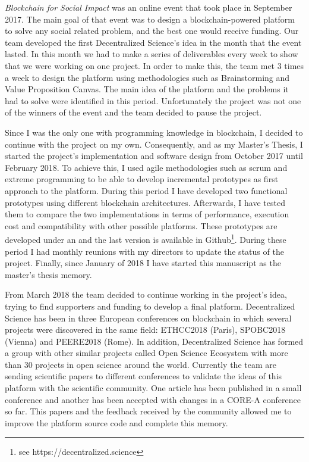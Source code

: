 \begin{itemize}
   \emph{Blockchain for Social Impact} was an online event
  that took place in September 2017. The main goal of that event was to design a
  blockchain-powered platform to solve any social related problem, and the best
  one would receive funding. Our team developed the first Decentralized
  Science's idea in the month that the event lasted. In this month we had to
  make a series of deliverables every week to show that we were working on one
  project. In order to make this, the team met 3 times a week to design the
  platform using methodologies such as Brainstorming and Value Proposition
  Canvas. The main idea of the platform and the problems it had to solve were
  identified in this period. Unfortunately the project was not one of the
  winners of the event and the team decided to pause the project.

   Since I was the only one with programming
  knowledge in blockchain, I decided to continue with the project on my own.
  Consequently, and as my Master's Thesis, I started the project's
  implementation and software design from October 2017 until February 2018. To
  achieve this, I used agile methodologies such as scrum and extreme programming
  to be able to develop incremental prototypes as first approach to the
  platform. During this period I have developed two functional prototypes using
  different blockchain architectures. Afterwards, I have tested them to compare
  the two implementations in terms of performance, execution cost and
  compatibility with other possible platforms. These prototypes are developed
  under an  and the last version is available in
  Github\footnote{see https://decentralized.science}. During these period I had
  monthly reunions with my directors to update the status of the project.
  Finally, since January of 2018 I have started this manuscript as the master's
  thesis memory.

   From March 2018 the team decided to continue working in
  the project's idea, trying to find supporters and funding to develop a final
  platform. Decentralized Science has been in three European conferences on
  blockchain in which several projects were discovered in the same field:
  ETHCC2018 (Paris), SPOBC2018 (Vienna) and PEERE2018 (Rome). In addition,
  Decentralized Science has formed a group with other similar projects called
  Open Science Ecosystem with more than 30 projects in open science around the
  world. Currently the team are sending scientific papers to different
  conferences to validate the ideas of this platform with the scientific
  community. One article has been published in a small conference and another
  has been accepted with changes in a CORE-A conference so far. This papers and
  the feedback received by the community allowed me to improve the platform
  source code and complete this memory.
  
\end{itemize}

